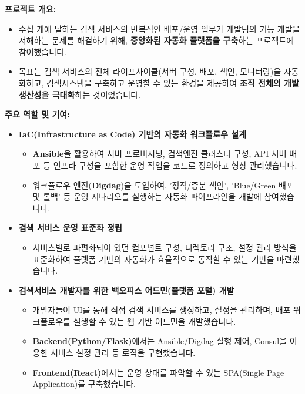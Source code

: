 \documentclass[letterpaper,11pt]{article}
\begin{document}
    {
      \textbf{프로젝트 개요:}
      \begin{itemize}[leftmargin=*]
          \item 수십 개에 달하는 검색 서비스의 반복적인 배포/운영 업무가 개발팀의 기능 개발을 저해하는 문제를 해결하기 위해, \textbf{중앙화된 자동화 플랫폼을 구축}하는 프로젝트에 참여했습니다.
          \item 목표는 검색 서비스의 전체 라이프사이클(서버 구성, 배포, 색인, 모니터링)을 자동화하고, 검색시스템을 구축하고 운영할 수 있는 환경을 제공하여 \textbf{조직 전체의 개발 생산성을 극대화}하는 것이었습니다.
      \end{itemize}

      \textbf{주요 역할 및 기여:}
      \begin{itemize}[leftmargin=*]
          \item \textbf{IaC(Infrastructure as Code) 기반의 자동화 워크플로우 설계}
              \begin{itemize}[leftmargin=*, label=$\circ$]
                  \item \textbf{Ansible}을 활용하여 서버 프로비저닝, 검색엔진 클러스터 구성, API 서버 배포 등 인프라 구성을 포함한 운영 작업을 코드로 정의하고 형상 관리했습니다.
                  \item 워크플로우 엔진(\textbf{Digdag})을 도입하여, '정적/증분 색인', 'Blue/Green 배포 및 롤백' 등 운영 시나리오를 실행하는 자동화 파이프라인을 개발에 참여했습니다.
              \end{itemize}
 
          \item \textbf{검색 서비스 운영 표준화 정립}
              \begin{itemize}[leftmargin=*, label=$\circ$]
                  \item 서비스별로 파편화되어 있던 컴포넌트 구성, 디렉토리 구조, 설정 관리 방식을 표준화하여 플랫폼 기반의 자동화가 효율적으로 동작할 수 있는 기반을 마련했습니다.
              \end{itemize}

          \item \textbf{검색서비스 개발자를 위한 백오피스 어드민(플랫폼 포털) 개발}
              \begin{itemize}[leftmargin=*, label=$\circ$]
                  \item 개발자들이 UI를 통해 직접 검색 서비스를 생성하고, 설정을 관리하며, 배포 워크플로우를 실행할 수 있는 웹 기반 어드민을 개발했습니다.
                  \item \textbf{Backend(Python/Flask)}에서는 Ansible/Digdag 실행 제어, Consul을 이용한 서비스 설정 관리 등 로직을 구현했습니다.
                  \item \textbf{Frontend(React)}에서는 운영 상태를 파악할 수 있는 SPA(Single Page Application)를 구축했습니다.
              \end{itemize}
      \end{itemize}

}
\end{document}
